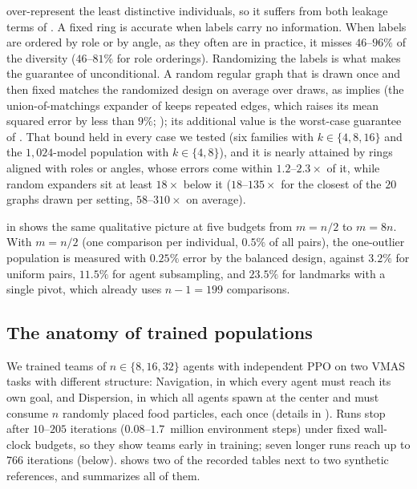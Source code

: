 \documentclass[twoside,11pt]{article}
\begin{document}
\begin{itemize}
over-represent the least distinctive individuals, so it suffers from both
leakage terms of . A fixed
  ring is accurate when labels carry no information. When labels are
  ordered by role or by angle, as they often are in practice, it misses
  $46$--$96\%$ of the diversity ($46$--$81\%$ for role orderings). Randomizing the labels is what makes the guarantee of
   unconditional. A random regular graph that is drawn
  once and then fixed matches the randomized design on average over draws,
  as  implies (the union-of-matchings expander of
   keeps repeated edges, which raises its mean squared error by
  less than $9\%$; ); its additional value is the worst-case
  guarantee of . That bound held in every case we
  tested (six families with $k\in\{4,8,16\}$ and the $1{,}024$-model population with
  $k\in\{4,8\}$), and it
  is nearly attained by rings aligned with roles or angles, whose errors come within
  $1.2$--$2.3\times$ of it, while random expanders sit at least $18\times$
  below it ($18$--$135\times$ for the closest of the $20$ graphs drawn per
  setting, $58$--$310\times$ on average).
\end{itemize}
 in  shows the same qualitative picture at
five budgets from $m=n/2$ to $m=8n$. With $m=n/2$ (one comparison per
individual, $0.5\%$ of all pairs), the one-outlier population is measured
with $0.25\%$ error by the balanced design, against $3.2\%$ for uniform
pairs, $11.5\%$ for agent subsampling, and $23.5\%$ for landmarks with a
single pivot, which already uses $n-1=199$ comparisons.






\subsection{The anatomy of trained populations}
\label{sec:exp-anatomy}

We trained teams of $n\in\{8,16,32\}$ agents with independent PPO on two
VMAS tasks with different structure: Navigation, in which every agent must
reach its own goal, and Dispersion, in which all agents spawn at the center
and must consume $n$ randomly placed food particles, each once (details in
). Runs stop after $10$--$205$ iterations
(\mbox{$0.08$--$1.7$}~million environment steps) under fixed wall-clock
budgets, so they show teams early in training; seven longer runs reach
up to $766$ iterations (below).
 shows two of the recorded tables
next to two synthetic references, and  summarizes all of them.
\end{document}
